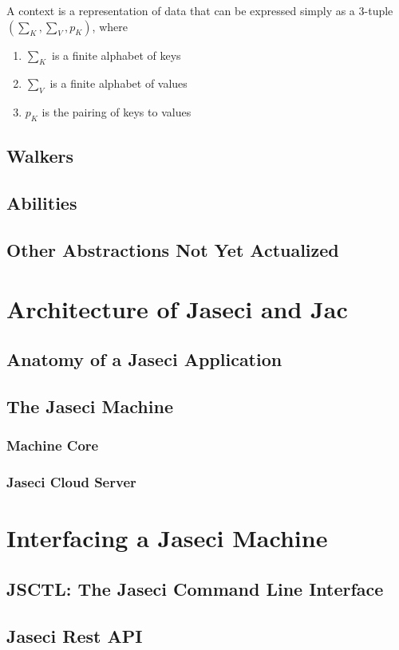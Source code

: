\documentclass{book}
\begin{document}
A context is a representation of data that can be expressed simply as a $3$-tuple $(\sum_K,\sum_V,p_K)$, where
\begin{enumerate}
    \item $\sum_K$ is a finite alphabet of keys
    \item $\sum_V$ is a finite alphabet of values
    \item $p_K$ is the pairing of keys to values
\end{enumerate}

\section{Walkers}
\section{Abilities}
\section{Other Abstractions Not Yet Actualized}

\chapter{Architecture of Jaseci and Jac}
\section{Anatomy of a Jaseci Application}
\section{The Jaseci Machine}
\subsection{Machine Core}
\subsection{Jaseci Cloud Server}

\chapter{Interfacing a Jaseci Machine}
\section{JSCTL: The Jaseci Command Line Interface}
\section{Jaseci Rest API}
\end{document}
